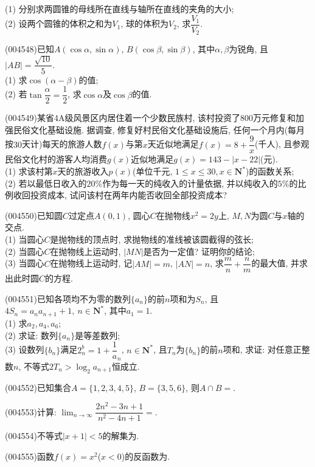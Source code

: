 (1) 分别求两圆锥的母线所在直线与轴所在直线的夹角的大小;\\
(2) 设两个圆锥的体积之和为$V_1$, 球的体积为$V_2$, 求$\dfrac{V_1}{V_2}$.
\item (004548)已知$A(\cos \alpha,\sin\alpha)$, $B(\cos\beta,\sin\beta)$, 其中$\alpha,\beta$为锐角, 且$|AB|=\dfrac{\sqrt{10}}5$.\\
(1) 求$\cos(\alpha-\beta)$的值;\\
(2) 若$\tan\dfrac\alpha 2=\dfrac 12$, 求$\cos\alpha$及$\cos\beta$的值.
\item (004549)某省4A级风景区内居住着一个少数民族村, 该村投资了$800$万元修复和加强民俗文化基础设施. 据调查, 修复好村民俗文化基础设施后, 任何一个月内(每月按$30$天计)每天的旅游人数$f(x)$与第$x$天近似地满足$f(x)=8+\dfrac 9x$(千人), 且参观民俗文化村的游客人均消费$g(x)$近似地满足$g(x)=143-|x-22|$(元).\\
(1) 求该村第$x$天的旅游收入$p(x)$(单位千元, $1\le x\le 30,x\in \mathbf{N}^*$)的函数关系;\\
(2) 若以最低日收入的$20\%$作为每一天的纯收入的计量依据, 并以纯收入的$5\%$的比例收回投资成本, 试问该村在两年内能否收回全部投资成本?
\item (004550)已知圆$C$过定点$A(0,1)$, 圆心$C$在抛物线$x^2=2y$上, $M,N$为圆$C$与$x$轴的交点.\\
(1) 当圆心$C$是抛物线的顶点时, 求抛物线的准线被该圆截得的弦长;\\
(2) 当圆心$C$在抛物线上运动时, $|MN|$是否为一定值? 证明你的结论;\\
(3) 当圆心$C$在抛物线上运动时, 记$|AM|=m$, $|AN|=n$, 求$\dfrac mn+\dfrac nm$的最大值, 并求出此时圆$C$的方程.
\item (004551)已知各项均不为零的数列$\{a_n\}$的前$n$项和为$S_n$, 且$4S_n=a_na_{n+1}+1, \ n\in \mathbf{N}^*$, 其中$a_1=1$.\\
(1) 求$a_2,a_4,a_6$;\\
(2) 求证: 数列$\{a_n\}$是等差数列;\\
(3) 设数列$\{b_n\}$满足$2^b_n=1+\dfrac 1a_n$, $n\in \mathbf{N}^*$, 且$T_n$为$\{b_n\}$的前$n$项和, 求证: 对任意正整数$n$, 不等式$2T_n>\log_2 a_{n+1}$恒成立.
\item (004552)已知集合$A=\{1,2,3,4,5\}$, $B=\{3,5,6\}$, 则$A\cap B=$.
\item (004553)计算: $\displaystyle\lim_{n\to\infty}\dfrac{2n^2-3n+1}{n^2-4n+1}=$.
\item (004554)不等式$|x+1|<5$的解集为.
\item (004555)函数$f(x)=x^2$($x<0$)的反函数为.
